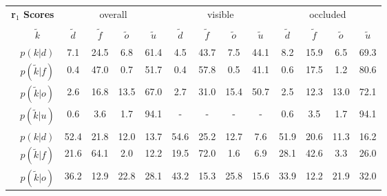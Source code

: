 \begin{center}
\begin{tabular}{c|c|cccc|cccc|cccc}
		\hline
		\multicolumn{2}{c|}{\textbf{\gls{r}$_1$ Scores}} & \multicolumn{4}{c|}{overall} & \multicolumn{4}{c|}{visible} & \multicolumn{4}{c}{occluded}\\
		\multicolumn{13}{c}{}\\
		&$\tilde{k}$ & $\tilde{d}$ & $\tilde{f}$ & $\tilde{o}$ & $\tilde{u}$ & $\tilde{d}$ & $\tilde{f}$ & $\tilde{o}$ & $\tilde{u}$ & $\tilde{d}$ & $\tilde{f}$ & $\tilde{o}$ & $\tilde{u}$\\
		\hline
		\parbox[t]{2mm}{}&$p(k|d)$ & \textcolor{mygreen}{7.1} & \textcolor{myred}{24.5} & \textcolor{myred}{6.8} & 61.4 & \textcolor{mygreen}{4.5} & \textcolor{myred}{43.7} & \textcolor{myred}{7.5} & 44.1 & \textcolor{mygreen}{8.2} & \textcolor{myred}{15.9} & \textcolor{myred}{6.5} & 69.3\\
		&$p(\tilde{k}|f)$ & \textcolor{myred}{0.4} & \textcolor{mygreen}{47.0} & \textcolor{myred}{0.7} & 51.7 & \textcolor{myred}{0.4} & \textcolor{mygreen}{57.8} & \textcolor{myred}{0.5} & 41.1 & \textcolor{myred}{0.6} & \textcolor{mygreen}{17.5} & \textcolor{myred}{1.2} & 80.6\\
		&$p(\tilde{k}|o)$ & \textcolor{myred}{2.6} & \textcolor{myred}{16.8} & \textcolor{mygreen}{13.5} & 67.0 & \textcolor{myred}{2.7} & \textcolor{myred}{31.0} & \textcolor{mygreen}{15.4} & 50.7 & \textcolor{myred}{2.5} & \textcolor{myred}{12.3} & \textcolor{mygreen}{13.0} & 72.1\\
		&$p(\tilde{k}|u)$ & 0.6 & 3.6 & 1.7 & 94.1 & - & - & - & - & 0.6 & 3.5 & 1.7 & 94.1\\
		\hline
		\parbox[t]{2mm}{}&$p(k|d)$ & \textcolor{mygreen}{52.4} & \textcolor{myred}{21.8} & \textcolor{myred}{12.0} & 13.7 & \textcolor{mygreen}{54.6} & \textcolor{myred}{25.2} & \textcolor{myred}{12.7} & 7.6 & \textcolor{mygreen}{51.9} & \textcolor{myred}{20.6} & \textcolor{myred}{11.3} & 16.2\\
		&$p(\tilde{k}|f)$ & \textcolor{myred}{21.6} & \textcolor{mygreen}{64.1} & \textcolor{myred}{2.0} & 12.2 & \textcolor{myred}{19.5} & \textcolor{mygreen}{72.0} & \textcolor{myred}{1.6} & 6.9 & \textcolor{myred}{28.1} & \textcolor{mygreen}{42.6} & \textcolor{myred}{3.3} & 26.0\\
		&$p(\tilde{k}|o)$ & \textcolor{myred}{36.2} & \textcolor{myred}{12.9} & \textcolor{mygreen}{22.8} & 28.1 & \textcolor{myred}{43.2} & \textcolor{myred}{15.3} & \textcolor{mygreen}{25.8} & 15.6 & \textcolor{myred}{33.9} & \textcolor{myred}{12.2} & \textcolor{mygreen}{21.9} & 32.0\\

\end{tabular}
\end{center}
